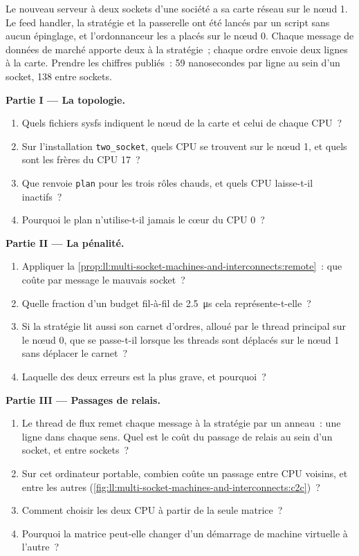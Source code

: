 \begin{problem}\label{pb:ll:multi-socket-machines-and-interconnects:1}
Le nouveau serveur à deux sockets d'une société a sa carte réseau sur le nœud 1. Le feed handler, la stratégie et la passerelle ont été lancés par un
script sans aucun épinglage, et l'ordonnanceur les a placés sur le nœud 0. Chaque message de données de marché apporte deux  à la
stratégie~; chaque ordre envoie deux lignes à la carte. Prendre les chiffres publiés~: 59 nanosecondes par ligne au sein d'un socket, 138
entre sockets.

\medskip\noindent\textbf{Partie I --- La topologie.}
\begin{enumerate}
\item Quels fichiers sysfs indiquent le nœud de la carte et celui de chaque CPU~?
\item Sur l'installation \texttt{two\_socket}, quels CPU se trouvent sur le nœud 1, et quels sont les frères du CPU 17~?
\item Que renvoie \texttt{plan} pour les trois rôles chauds, et quels CPU laisse-t-il inactifs~?
\item Pourquoi le plan n'utilise-t-il jamais le cœur du CPU 0~?
\end{enumerate}

\medskip\noindent\textbf{Partie II --- La pénalité.}
\begin{enumerate}[resume]
\item Appliquer la \cref{prop:ll:multi-socket-machines-and-interconnects:remote}~: que coûte par message le mauvais socket~?
\item Quelle fraction d'un budget fil-à-fil de \qty{2.5}{\micro\second} cela représente-t-elle~?
\item Si la stratégie lit aussi son carnet d'ordres, alloué par le thread principal sur le nœud 0, que se passe-t-il lorsque les threads sont
déplacés sur le nœud 1 sans déplacer le carnet~?
\item Laquelle des deux erreurs est la plus grave, et pourquoi~?
\end{enumerate}

\medskip\noindent\textbf{Partie III --- Passages de relais.}
\begin{enumerate}[resume]
\item Le thread de flux remet chaque message à la stratégie par un anneau~: une ligne dans chaque sens. Quel est le coût du passage de relais
au sein d'un socket, et entre sockets~?
\item Sur cet ordinateur portable, combien coûte un passage entre CPU voisins, et entre les autres (\cref{fig:ll:multi-socket-machines-and-interconnects:c2c})~?
\item Comment choisir les deux CPU à partir de la seule matrice~?
\item Pourquoi la matrice peut-elle changer d'un démarrage de machine virtuelle à l'autre~?
\end{enumerate}


\end{problem}
